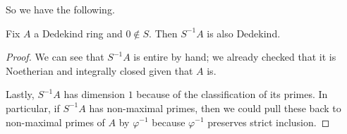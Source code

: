 \documentclass[../notes.tex]{subfiles}
\begin{document}
So we have the following.
\begin{proposition}
    Fix $A$ a Dedekind ring and $0\notin S.$ Then $S^{-1}A$ is also Dedekind.
\end{proposition}
\begin{proof}
    We can see that $S^{-1}A$ is entire by hand; we already checked that it is Noetherian and integrally closed given that $A$ is.

    Lastly, $S^{-1}A$ has dimension $1$ because of the classification of its primes. In particular, if $S^{-1}A$ has non-maximal primes, then we could pull these back to non-maximal primes of $A$ by $\varphi^{-1}$ because $\varphi^{-1}$ preserves strict inclusion.
\end{proof}
\end{document}
